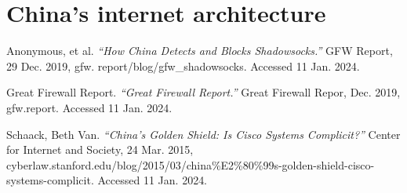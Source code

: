 \documentclass[11pt]{article}
\begin{document}
\section{China's internet architecture}


\newpage

\begin{thebibliography}{9}
	 Anonymous, et al. \textit{``How China Detects
		and Blocks Shadowsocks.''} GFW Report, 29 Dec. 2019, gfw.
	report/blog/gfw\_shadowsocks. Accessed 11 Jan. 2024.

	 Great Firewall Report. \textit{``Great Firewall Report.''}
	Great Firewall Repor, Dec. 2019, gfw.report. Accessed 11 Jan. 2024.

	Schaack, Beth Van. \textit{``China's Golden Shield: Is Cisco Systems Complicit?''} Center
	for Internet and Society, 24 Mar. 2015, cyberlaw.stanford.edu/blog/2015/03/china\%E2\%80\%99s-golden-shield-cisco-systems-complicit.
	Accessed 11 Jan. 2024.

\end{thebibliography}
\end{document}
